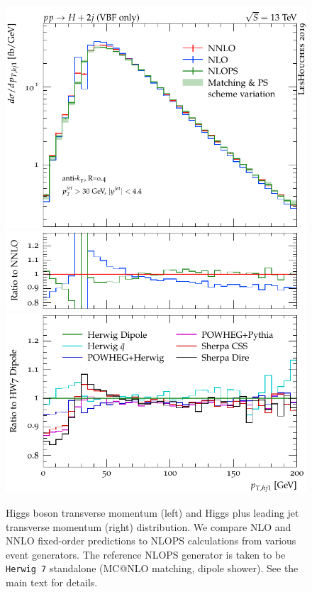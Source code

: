 \documentclass[10pt,prd,fleqn,superscriptaddress,notitlepage,nofootinbib,preprintnumbers,nobalancelastpage]{revtex4-1}
\newcommand{\HW}{\texttt{Herwig 7}\xspace}
\begin{document}
\begin{figure}[tp]
\begin{minipage}{.295\textwidth}
    \includegraphics[width=\textwidth]{figures/tools/pthj1.pdf}
    \includegraphics[width=\textwidth]{figures/tools/pthj1_rFO.pdf}
    \includegraphics[width=\textwidth]{figures/tools/pthj1_rMC.pdf}
  \end{minipage}\hfill
\caption{Higgs boson transverse momentum (left) and Higgs plus leading jet transverse momentum (right) distribution. We compare NLO and NNLO fixed-order predictions to NLOPS calculations from various event generators. The reference NLOPS generator is taken to be \HW{} standalone (MC@NLO matching, dipole shower).
    See the main text for details.}
\label{fig:incl_pth_mc}
\end{figure}
\end{document}
